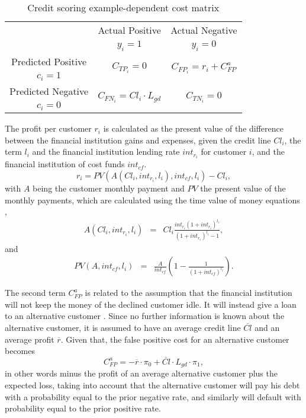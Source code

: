   \begin{table}
  \centering
  \footnotesize
    \begin{tabular}{c|c|c}
      \multicolumn{1}{c|}{}  & Actual Positive& Actual Negative \\
      \multicolumn{1}{c|}{} & $y_i=1$& $y_i=0$ \\
      \hline
      Predicted Positive& \multirow{ 2}{*}{$C_{TP_i}=0$} & \multirow{2}{*}{$C_{FP_i}=r_i+C^a_{FP}$} 
      \\
      $c_i=1$ & &\\
      \hline
      Predicted Negative& \multirow{ 2}{*}{$C_{FN_i}=Cl_i \cdot L_{gd}$} & \multirow{
      2}{*}{$C_{TN_i}=0$} \\
      $c_i=0$ & &\\
    \end{tabular}
  \caption{Credit scoring example-dependent cost matrix}
  \label{tab:4:costmat2}
  \end{table}
  
  The profit per customer $r_i$ is calculated as the present value of the difference between the 
  financial institution gains and expenses, given the credit line $Cl_i$, the term $l_i$ and the 
  financial institution lending rate $int_{r_i}$ for customer $i$, and the financial institution 
  of cost funds $int_{cf}$.
  \begin{equation}
    r_i= PV(A(Cl_i,int_{r_i},l_i),int_{cf},l_i)-Cl_i,
  \end{equation}
  with $A$ being the customer monthly payment and $PV$ the present value of the monthly payments,
  which are calculated using the time value of money equations \citep{Lawrence2012},
  \begin{eqnarray}
    A(Cl_i,int_{r_i},l_i) &=&  Cl_i \frac{int_{r_i}(1+int_{r_i})^{l_i}}{(1+int_{r_i})^{l_i}-1},
  \end{eqnarray}
  and 
  \begin{eqnarray}
    PV(A,int_{cf},l_i) &=& \frac{A}{int_{cf}} \left(1-\frac{1}{(1+int_{cf})^{l_i}} \right).
  \end{eqnarray}
    
  The second term $C^a_{FP}$ is related to the assumption that the financial institution will not 
  keep the money of the declined customer idle. It will instead give a loan to an alternative 
  customer \citep{Nayak1997}. Since no further information is known about the alternative customer, 
  it is assumed to have an average credit line $\overline{Cl}$ and an average profit $\overline{r}$.
  Given that, the false positive cost for an alternative customer becomes 
  \begin{equation}
    C^a_{FP}=- \overline{r} \cdot \pi_0+\overline{Cl}\cdot L_{gd} \cdot \pi_1,
  \end{equation}
  in other words minus the profit of an average alternative customer plus the expected loss, 
  taking into account that the alternative customer will pay his debt with a probability equal to 
  the prior negative rate, and similarly will default with probability equal to the prior positive 
  rate.

